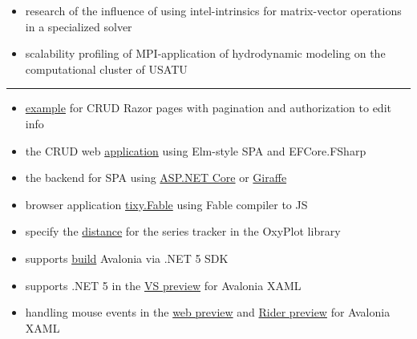 \documentclass[10pt,a4paper,ragged2e,withhyper]{altacv}
\begin{document}
\begin{paracol}{2}
\begin{itemize}
  \item research of the influence of using  intel-intrinsics for matrix-vector
  \newline operations in a specialized solver
  \smallskip

  \item scalability profiling of MPI-application of hydrodynamic modeling
  \newline on the computational cluster of USATU

\end{itemize}

{\color{headingrule}\rule{\linewidth}{1pt}\par}\medskip


\smallskip

\begin{itemize}

  \item \href{https://github.com/rstm-sf/FilmsCatalog/pull/1}{example}
  for CRUD Razor pages with pagination
  and authorization to edit info
  \smallskip

  \item the CRUD web
  \href{https://github.com/rstm-sf/ClientServerCRUD}{application}
  using Elm-style SPA and EFCore.FSharp
  \smallskip

  \item the backend for SPA using
  \href{https://github.com/rstm-sf/ASP.NETCoreBackendFor-Angular-GettingStarted}{ASP.NET Core} or
  \href{https://github.com/rstm-sf/GiraffeBackendFor-Angular-GettingStarted}{Giraffe}
  \smallskip

  \item browser application
  \href{https://github.com/rstm-sf/tixy.Fable}{tixy.Fable}
  using Fable compiler to JS
  \smallskip

  \item specify the
  \href{https://github.com/oxyplot/oxyplot/pull/1736}{distance}
  for the series tracker in the OxyPlot library
  \smallskip

  \item supports
  \href{https://github.com/AvaloniaUI/Avalonia/pull/5415}{build}
  Avalonia via .NET 5 SDK
  \smallskip

  \item supports .NET 5 in the
  \href{https://github.com/AvaloniaUI/AvaloniaVS/pull/181}{VS preview}
  for Avalonia XAML
  \smallskip

  \item handling mouse events in the
  \href{https://github.com/AvaloniaUI/Avalonia/pull/4418}{web preview}
  and \href{https://github.com/ForNeVeR/AvaloniaRider/pull/82}{Rider preview}
  for \newline Avalonia XAML
  \smallskip


\end{itemize}
\end{paracol}
\end{document}
